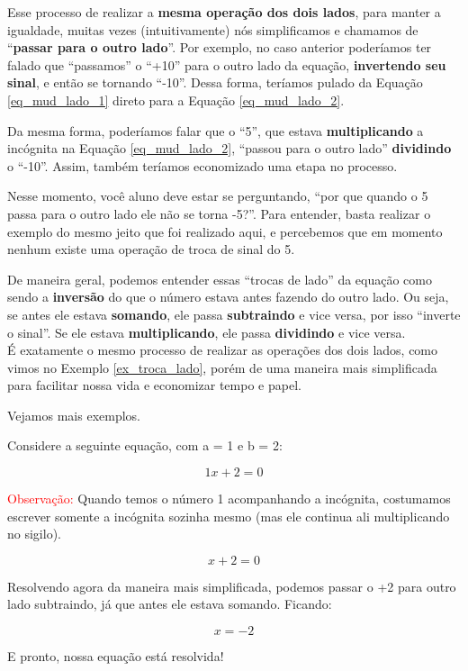 Esse processo de realizar a \textbf{mesma operação dos dois lados}, para manter a igualdade, muitas vezes (intuitivamente) nós simplificamos e chamamos de ``\textbf{passar para o outro lado}''. Por exemplo, no caso anterior poderíamos ter falado que ``passamos'' o ``+10'' para o outro lado da equação, \textbf{invertendo seu sinal}, e então se tornando ``-10''. Dessa forma, teríamos pulado da Equação \ref{eq_mud_lado_1} direto para a Equação \ref{eq_mud_lado_2}.

Da mesma forma, poderíamos falar que o ``5'', que estava \textbf{multiplicando} a incógnita na Equação \ref{eq_mud_lado_2}, ``passou para o outro lado'' \textbf{dividindo} o ``-10''. Assim, também teríamos economizado uma etapa no processo. 

Nesse momento, você aluno deve estar se perguntando, ``por que quando o 5 passa para o outro lado ele não se torna -5?''. Para entender, basta realizar o exemplo do mesmo jeito que foi realizado aqui, e percebemos que em momento nenhum existe uma operação de troca de sinal do 5.

\begin{tcolorbox}[title = IMPORTANTE]
    De maneira geral, podemos entender essas ``trocas de lado'' da equação como sendo a \textbf{inversão} do que o número estava antes fazendo do outro lado. Ou seja, se antes ele estava \textbf{somando}, ele passa \textbf{subtraindo} e vice versa, por isso ``inverte o sinal''. Se ele estava \textbf{multiplicando}, ele passa \textbf{dividindo} e vice versa.\\

    É exatamente o mesmo processo de realizar as operações dos dois lados, como vimos no Exemplo \ref{ex_troca_lado}, porém de uma maneira mais simplificada para facilitar nossa vida e economizar tempo e papel.
\end{tcolorbox}

Vejamos mais exemplos.

\begin{exemplo}
    Considere a seguinte equação, com a = 1 e b = 2:

    \begin{equation}
        1x+2=0
    \end{equation}

    \textcolor{red}{Observação:} Quando temos o número 1 acompanhando a incógnita, costumamos escrever somente a incógnita sozinha mesmo (mas ele continua ali multiplicando no sigilo). 

    \begin{equation}
        x+2=0
    \end{equation}
    
    Resolvendo agora da maneira mais simplificada, podemos passar o +2 para outro lado subtraindo, já que antes ele estava somando. Ficando:

    \begin{equation}
        x=-2
    \end{equation}

    E pronto, nossa equação está resolvida!
\end{exemplo}

